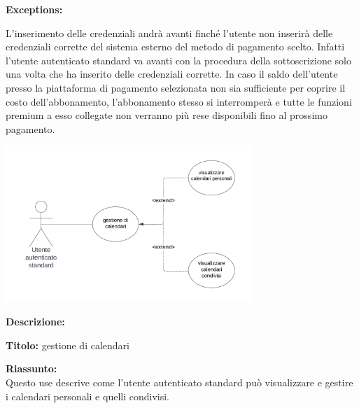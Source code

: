 \begin{listaPersonale}[UC]{}

    \textbf{Exceptions:}
    \begin{enumerate}[label=\textbf{[exception \arabic{enumii}]}, ref= \textbf{[exception \arabic{enumii}]}]
         L'inserimento delle credenziali andrà avanti finché l'utente non inserirà delle credenziali corrette del sistema esterno del metodo di pagamento scelto. Infatti l'utente autenticato standard va avanti con la procedura della sottoscrizione solo una volta che ha inserito delle credenziali corrette.
         In caso il saldo dell'utente presso la piattaforma di pagamento selezionata non sia sufficiente per coprire il costo dell'abbonamento, l'abbonamento stesso si interromperà e tutte le funzioni premium a esso collegate non verranno più rese disponibili fino al prossimo pagamento.
    \end{enumerate}






    \newpage


    \begin{center}
        \includegraphics[width=0.7\textwidth]{img/Diagrammi/UseCases/CondivisioneCalendario.png}
    \end{center}

    \textbf{Descrizione:}

    \textbf{Titolo:} gestione di calendari

    \textbf{Riassunto:} \\
    Questo use descrive come l'utente autenticato standard può visualizzare e gestire i calendari personali e quelli condivisi.


\end{listaPersonale}
